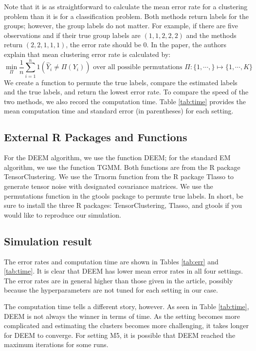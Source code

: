 \documentclass[11pt]{article}
\begin{document}
Note that it is as straightforward to calculate the mean error rate for a clustering problem than it is for a classification problem. Both methods return labels for the groups; however, the group labels do not matter. For example, if there are five observations and if their true group labels are $(1,1,2,2,2)$ and the methods return $(2,2,1,1,1)$, the error rate should be $0$. In the paper, the authors explain that mean clustering error rate is calculated by: 
\[ \min_\Pi \frac{1}{n} \sum_{i=1}^n 1 (\hat{Y}_i \ne \Pi (Y_i)) \text{ over all possible permutations } \Pi: \{1, \cdots,  \} \mapsto \{1, \cdots, K\} \]
We create a function to permute the true labels, compare the estimated labels and the true labels, and return the lowest error rate. To compare the speed of the two methods, we also record the computation time. Table \ref{tab:time} provides the mean computation time and standard error (in parentheses) for each setting. 

\subsection{External R Packages and Functions}

For the DEEM algorithm, we use the function DEEM; for the standard EM algorithm, we use the function TGMM. Both functions are from the R package TensorClustering. We use the Trnorm function from the R package Tlasso to generate tensor noise with designated covariance matrices. We use the permutations function in the gtools package to permute true labels. In short, be sure to install the three R packages: TensorClustering, Tlasso, and gtools if you would like to reproduce our simulation. 


\subsection{Simulation result}

The error rates and computation time are shown in Tables \ref{tab:err} and \ref{tab:time}. It is clear that DEEM has lower mean error rates in all four settings. The error rates are in general higher than those given in the article, possibly because the hyperparameters are not tuned for each setting in our case.

The computation time tells a different story, however. As seen in Table \ref{tab:time}, DEEM is not always the winner in terms of time. As the setting becomes more complicated and estimating the clusters becomes more challenging, it takes longer for DEEM to converge. For setting M5, it is possible that DEEM reached the maximum iterations for some runs. 
\end{document}
